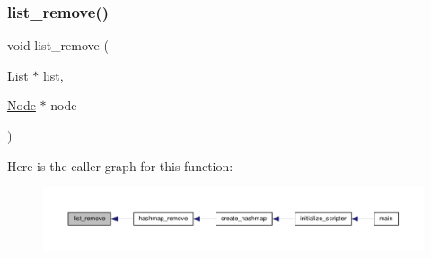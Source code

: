\subsubsection{\texorpdfstring{list\+\_\+remove()}{list\_remove()}}
{\footnotesize\ttfamily void list\+\_\+remove (\begin{DoxyParamCaption}\item[{\hyperlink{structList}{List} $\ast$}]{list,  }\item[{\hyperlink{structNode}{Node} $\ast$}]{node }\end{DoxyParamCaption})}

Here is the caller graph for this function\+:
\nopagebreak
\begin{figure}[H]
\begin{center}
\leavevmode
\includegraphics[width=350pt]{linked-list_8c_ad17dd6e2d3e64d3e9665f313ffb808a1_icgraph}
\end{center}
\end{figure}
